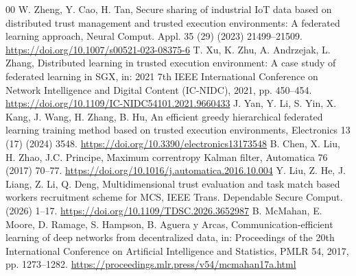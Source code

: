 \documentclass[final,5p,times,twocolumn]{elsarticle/elsarticle}
\begin{document}
\begin{thebibliography}{00}
     W. Zheng, Y. Cao, H. Tan, Secure sharing of industrial IoT data based on distributed trust management and trusted execution environments: A federated learning approach, Neural Comput. Appl. 35 (29) (2023) 21499--21509. \url{https://doi.org/10.1007/s00521-023-08375-6}
     T. Xu, K. Zhu, A. Andrzejak, L. Zhang, Distributed learning in trusted execution environment: A case study of federated learning in SGX, in: 2021 7th IEEE International Conference on Network Intelligence and Digital Content (IC-NIDC), 2021, pp. 450--454. \url{https://doi.org/10.1109/IC-NIDC54101.2021.9660433}
     J. Yan, Y. Li, S. Yin, X. Kang, J. Wang, H. Zhang, B. Hu, An efficient greedy hierarchical federated learning training method based on trusted execution environments, Electronics 13 (17) (2024) 3548. \url{https://doi.org/10.3390/electronics13173548}
     B. Chen, X. Liu, H. Zhao, J.C. Principe, Maximum correntropy Kalman filter, Automatica 76 (2017) 70--77. \url{https://doi.org/10.1016/j.automatica.2016.10.004}
     Y. Liu, Z. He, J. Liang, Z. Li, Q. Deng, Multidimensional trust evaluation and task match based workers recruitment scheme for MCS, IEEE Trans. Dependable Secure Comput. (2026) 1--17. \url{https://doi.org/10.1109/TDSC.2026.3652987}
     B. McMahan, E. Moore, D. Ramage, S. Hampson, B. Aguera y Arcas, Communication-efficient learning of deep networks from decentralized data, in: Proceedings of the 20th International Conference on Artificial Intelligence and Statistics, PMLR 54, 2017, pp. 1273--1282. \url{https://proceedings.mlr.press/v54/mcmahan17a.html}

\end{thebibliography}
\endgroup
\end{document}
